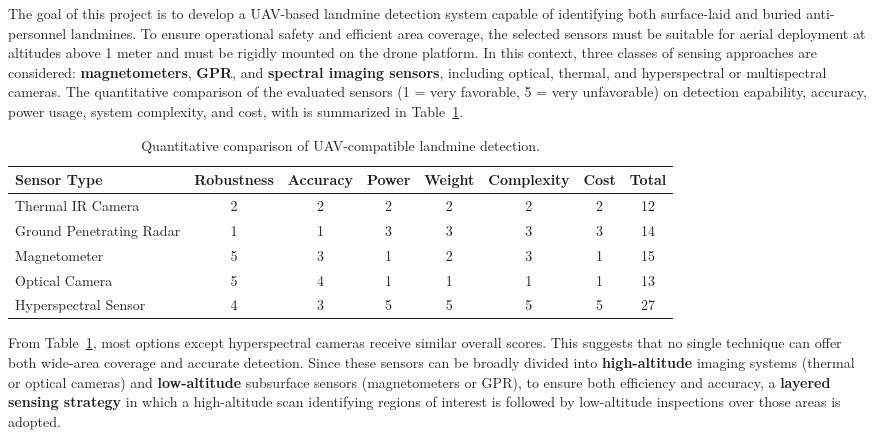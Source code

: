 The goal of this project is to develop a UAV-based landmine detection system capable of identifying both surface-laid and buried anti-personnel landmines. To ensure operational safety and efficient area coverage, the selected sensors must be suitable for aerial deployment at altitudes above 1 meter and must be rigidly mounted on the drone platform. In this context, three classes of sensing approaches are considered: \textbf{magnetometers}, \textbf{GPR}, and \textbf{spectral imaging sensors}, including optical, thermal, and hyperspectral or multispectral cameras. The quantitative comparison of the evaluated sensors (1 = very favorable, 5 = very unfavorable) on detection capability, accuracy, power usage, system complexity, and cost, with is summarized in Table~\ref{tab:sensor_comparison}.


\begin{table}[h]
    \centering
    \small
    \renewcommand{\arraystretch}{1.3}
    \caption{Quantitative comparison of UAV-compatible landmine detection.}
    \label{tab:sensor_comparison}
    \begin{tabular}{l c c c c c c c}
        \toprule
        \textbf{Sensor Type} & \textbf{Robustness} & \textbf{Accuracy} & \textbf{Power} & \textbf{Weight} & \textbf{Complexity} & \textbf{Cost} & \textbf{Total} \\
        \midrule
        Thermal IR Camera        & 2 & 2 & 2 & 2 & 2 & 2 & 12 \\
        Ground Penetrating Radar & 1 & 1 & 3 & 3 & 3 & 3 & 14 \\
        Magnetometer             & 5 & 3 & 1 & 2 & 3 & 1 & 15 \\
        Optical Camera           & 5 & 4 & 1 & 1 & 1 & 1 & 13 \\
        Hyperspectral Sensor     & 4 & 3 & 5 & 5 & 5 & 5 & 27 \\
        \bottomrule
    \end{tabular}
\end{table}

From Table~\ref{tab:sensor_comparison}, most options except hyperspectral cameras receive similar overall scores. This suggests that no single technique can offer both wide-area coverage and accurate detection. Since these sensors can be broadly divided into \textbf{high-altitude} imaging systems (thermal or optical cameras) and \textbf{low-altitude} subsurface sensors (magnetometers or GPR), to ensure both efficiency and accuracy, a \textbf{layered sensing strategy} in which a high-altitude scan identifying regions of interest is followed by low-altitude inspections over those areas is adopted.

